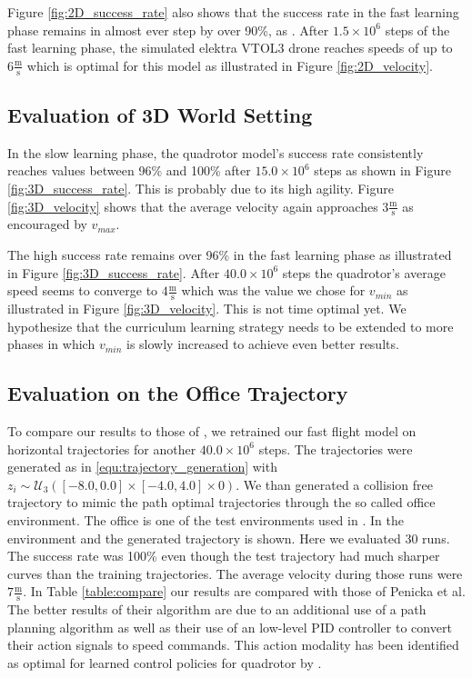 Figure \ref{fig:2D_success_rate} also shows that the success rate in the fast learning phase remains in almost ever step by over 90\%, as . After $1.5 \times 10^6$ steps of the fast learning phase, the simulated elektra VTOL3 drone reaches speeds of up to $6\frac{\text{m}}{\text{s}}$ which is optimal for this model as illustrated in Figure \ref{fig:2D_velocity}.

\subsection{Evaluation of 3D World Setting}
In the slow learning phase, the quadrotor model's success rate consistently reaches values between 96\% and 100\% after $15.0 \times 10^6$ steps as shown in Figure \ref{fig:3D_success_rate}. This is probably due to its high agility. Figure \ref{fig:3D_velocity} shows that the average velocity again approaches $3\frac{\text{m}}{\text{s}}$ as encouraged by $v_{max}$. 

The high success rate remains over 96\% in the fast learning phase as illustrated in Figure \ref{fig:3D_success_rate}. After $40.0 \times 10^6$ steps the quadrotor's average speed seems to converge to $4\frac{\text{m}}{\text{s}}$ which was the value we chose for $v_{min}$ as illustrated in Figure \ref{fig:3D_velocity}. This is not time optimal yet. We hypothesize that the curriculum learning strategy needs to be extended to more phases in which $v_{min}$ is slowly increased to achieve even better results. 

\subsection{Evaluation on the Office Trajectory}
To compare our results to those of \cite{Penicka_2022}, we retrained our fast flight model on horizontal trajectories for another $40.0 \times 10^6$ steps. The trajectories were generated as in \eqref{equ:trajectory_generation} with $z_i \sim \mathcal{U}_3([-8.0,0.0] \times [-4.0,4.0] \times 0)$. We than generated a collision free trajectory to mimic the path optimal trajectories through the so called office environment. The office is one of the test environments used in \cite{Penicka_2022}. In \cite{office_environment} the environment and the generated trajectory is shown. Here we evaluated 30 runs. The success rate was 100\% even though the test trajectory had much sharper curves than the training trajectories. The average velocity during those runs were $7 \frac{\text{m}}{\text{s}}$. In Table \ref{table:compare} our results are compared with those of Penicka et al. The better results of their algorithm are due to an additional use of a path planning algorithm as well as their use of an low-level PID controller to convert their action signals to speed commands. This action modality has been identified as optimal for learned control policies for quadrotor by \cite{Controller_benchmarking}. 

